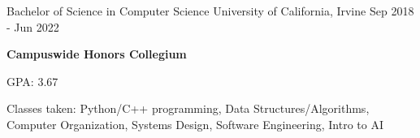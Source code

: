 
\begin{cventries}
  \cventry
    {Bachelor of Science in Computer Science} %
    {University of California, Irvine} %
    {} %
    {Sep 2018 - Jun 2022} %
    {
      \begin {cvitems}
        \item{\textbf{Campuswide Honors Collegium}}
        \item {GPA: 3.67}
        \item{Classes taken: Python/C++ programming, Data Structures/Algorithms,
        Computer Organization, Systems Design, Software Engineering, Intro to AI}
      \end{cvitems}
    }
\end{cventries}
